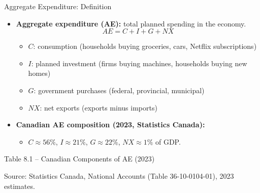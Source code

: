 \documentclass[aspectratio=169]{beamer}
\begin{document}
\begin{frame}{Aggregate Expenditure: Definition}
\transfade
\begin{itemize}[<+->]
  \item \textbf{Aggregate expenditure (AE):} total planned spending in the economy.
  \[
    AE = C + I + G + NX
  \]
  \begin{itemize}[<+->]
    \item $C$: consumption (households buying groceries, cars, Netflix subscriptions)
    \item $I$: planned investment (firms buying machines, households buying new homes)
    \item $G$: government purchases (federal, provincial, municipal)
    \item $NX$: net exports (exports minus imports)
  \end{itemize}
  \item \textbf{Canadian AE composition (2023, Statistics Canada):}
  \begin{itemize}[<+->]
    \item $C \approx 56\%$, $I \approx 21\%$, $G \approx 22\%$, $NX \approx 1\%$ of GDP.
  \end{itemize}
\end{itemize}
\end{frame}

\begin{frame}{Table 8.1 -- Canadian Components of AE (2023)}
\begin{center}
\end{center}
{\tiny Source: Statistics Canada, National Accounts (Table 36-10-0104-01), 2023 estimates.}
\end{frame}
\end{document}
